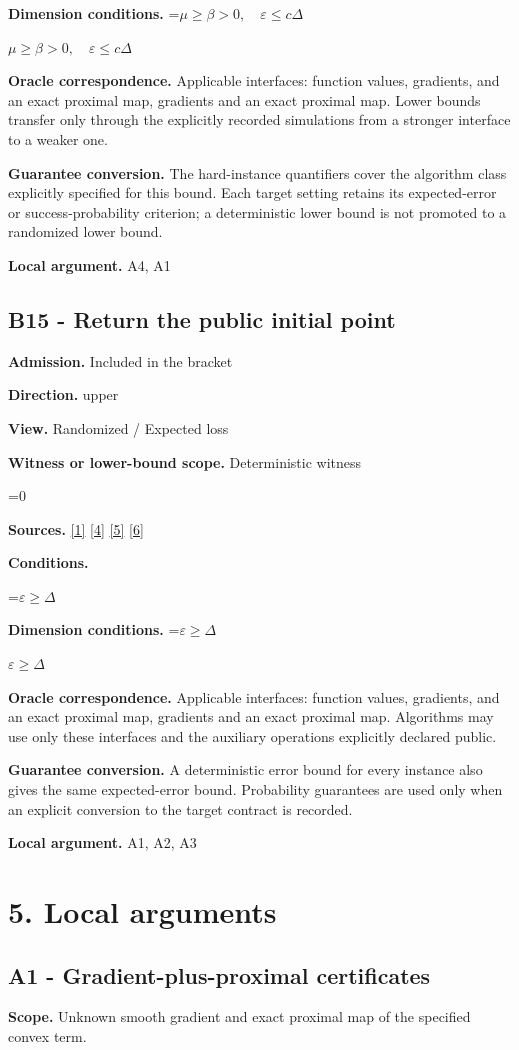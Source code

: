 \documentclass[10pt,a4paper]{article}
\newcommand{\AtlasMath}[1]{\par\begingroup\centering\setbox0=\hbox{$\displaystyle #1$}\ifdim\wd0>1.4\linewidth\typeout{ATLAS WIDE FORMULA: \the\wd0}\fi\ifdim\wd0>\linewidth\resizebox{\linewidth}{!}{\box0}\else\box0\fi\par\endgroup}
\newcommand{\AtlasInlineMath}[1]{\begingroup\setbox0=\hbox{$#1$}\ifdim\wd0>.4\linewidth\endgroup\AtlasMath{#1}\else\endgroup$#1$\fi}
\begin{document}
\textbf{Dimension conditions.} \AtlasInlineMath{\mu\ge\beta>0,\quad\varepsilon\le c\Delta}

\textbf{Oracle correspondence.} Applicable interfaces: function values, gradients, and an exact proximal map, gradients and an exact proximal map. Lower bounds transfer only through the explicitly recorded simulations from a stronger interface to a weaker one.

\textbf{Guarantee conversion.} The hard-instance quantifiers cover the algorithm class explicitly specified for this bound. Each target setting retains its expected-error or success-probability criterion; a deterministic lower bound is not promoted to a randomized lower bound.

\textbf{Local argument.} A4, A1

\subsection{B15 - Return the public initial point}
\textbf{Admission.} Included in the bracket

\textbf{Direction.} upper

\textbf{View.} Randomized / Expected loss

\textbf{Witness or lower-bound scope.} Deterministic witness

\AtlasMath{0}
\textbf{Sources.} \href{https://www.tau.ac.il/~becka/FISTA.pdf}{[1]} \href{https://arxiv.org/pdf/1405.4980}{[4]} \href{https://www2.isye.gatech.edu/~nemirovs/MOR_AccuracyCertificates.pdf}{[5]} \href{https://arxiv.org/pdf/2609.20701}{[6]}

\textbf{Conditions.} 
\AtlasMath{\varepsilon\ge\Delta}


\textbf{Dimension conditions.} \AtlasInlineMath{\varepsilon\ge\Delta}

\textbf{Oracle correspondence.} Applicable interfaces: function values, gradients, and an exact proximal map, gradients and an exact proximal map. Algorithms may use only these interfaces and the auxiliary operations explicitly declared public.

\textbf{Guarantee conversion.} A deterministic error bound for every instance also gives the same expected-error bound. Probability guarantees are used only when an explicit conversion to the target contract is recorded.

\textbf{Local argument.} A1, A2, A3

\section{5. Local arguments}
\subsection{A1 - Gradient-plus-proximal certificates}
\textbf{Scope.} Unknown smooth gradient and exact proximal map of the specified convex term.
\end{document}
